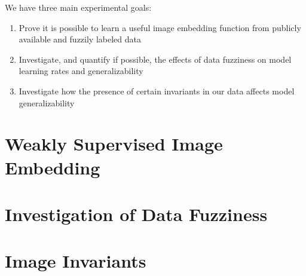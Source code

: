 We have three main experimental goals:
\begin{enumerate}
	\item Prove it is possible to learn a useful image embedding function from publicly available and fuzzily labeled data
	\item Investigate, and quantify if possible, the effects of data fuzziness on model learning rates and generalizability
	\item Investigate how the presence of certain invariants in our data affects model generalizability
\end{enumerate}

\section{Weakly Supervised Image Embedding}



\section{Investigation of Data Fuzziness}



\section{Image Invariants}

